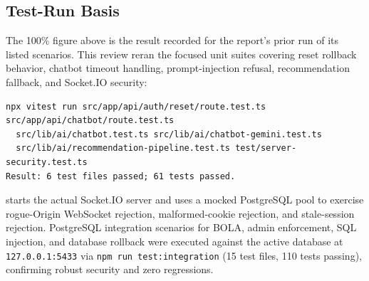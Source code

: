 \documentclass[10pt]{article}
\begin{document}
\subsection{Test-Run Basis}
The 100\% figure above is the result recorded for the report's prior run of its listed scenarios. This review reran the focused unit suites covering reset rollback behavior, chatbot timeout handling, prompt-injection refusal, recommendation fallback, and Socket.IO security:
\begin{verbatim}
npx vitest run src/app/api/auth/reset/route.test.ts src/app/api/chatbot/route.test.ts
  src/lib/ai/chatbot.test.ts src/lib/ai/chatbot-gemini.test.ts
  src/lib/ai/recommendation-pipeline.test.ts test/server-security.test.ts
Result: 6 test files passed; 61 tests passed.
\end{verbatim}
 starts the actual Socket.IO server and uses a mocked PostgreSQL pool to exercise rogue-Origin WebSocket rejection, malformed-cookie rejection, and stale-session rejection. PostgreSQL integration scenarios for BOLA, admin enforcement, SQL injection, and database rollback were executed against the active database at \texttt{127.0.0.1:5433} via \texttt{npm run test:integration} (15 test files, 110 tests passing), confirming robust security and zero regressions.
\end{document}
